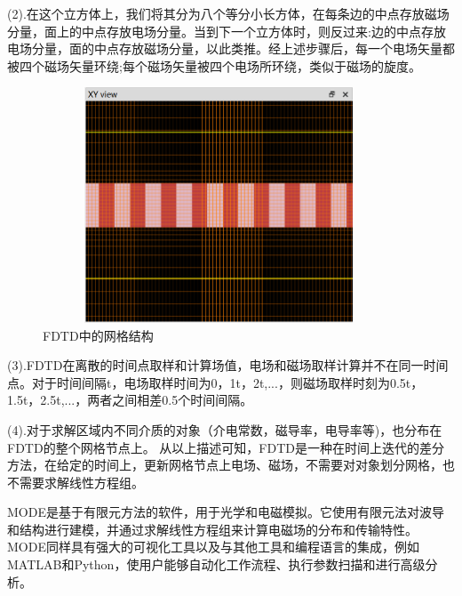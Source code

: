 \documentclass[UTF8,a4paper,12pt]{ctexart}
\numberwithin{equation}{section}
\begin{document}
(2).在这个立方体上，我们将其分为八个等分小长方体，在每条边的中点存放磁场分量，面上的中点存放电场分量。当到下一个立方体时，则反过来:边的中点存放电场分量，面的中点存放磁场分量，以此类推。经上述步骤后，每一个电场矢量都被四个磁场矢量环绕;每个磁场矢量被四个电场所环绕，类似于磁场的旋度。
\begin{figure}[htbp]
\centering %
\includegraphics[height=7cm,width=10.5cm]{fig4.png}
\caption{FDTD中的网格结构}
\label{3-2}
\end{figure}

(3).FDTD在离散的时间点取样和计算场值，电场和磁场取样计算并不在同一时间点。对于时间间隔t，电场取样时间为0，1t，2t,...，则磁场取样时刻为0.5t，1.5t，2.5t,...，两者之间相差0.5个时间间隔。

(4).对于求解区域内不同介质的对象（介电常数，磁导率，电导率等)，也分布在FDTD的整个网格节点上。
从以上描述可知，FDTD是一种在时间上迭代的差分方法，在给定的时间上，更新网格节点上电场、磁场，不需要对对象划分网格，也不需要求解线性方程组。

MODE是基于有限元方法的软件，用于光学和电磁模拟。它使用有限元法对波导和结构进行建模，并通过求解线性方程组来计算电磁场的分布和传输特性。MODE同样具有强大的可视化工具以及与其他工具和编程语言的集成，例如MATLAB和Python，使用户能够自动化工作流程、执行参数扫描和进行高级分析。
\end{document}
